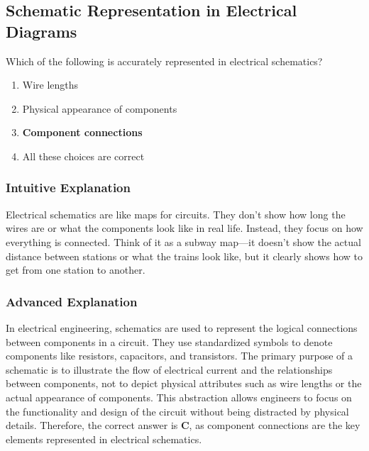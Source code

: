 \subsection{Schematic Representation in Electrical Diagrams}
\label{T6C12}

\begin{tcolorbox}[colback=gray!10!white,colframe=black!75!black,title=T6C12]
Which of the following is accurately represented in electrical schematics?
\begin{enumerate}[noitemsep]
    \item Wire lengths
    \item Physical appearance of components
    \item \textbf{Component connections}
    \item All these choices are correct
\end{enumerate}
\end{tcolorbox}

\subsubsection*{Intuitive Explanation}
Electrical schematics are like maps for circuits. They don't show how long the wires are or what the components look like in real life. Instead, they focus on how everything is connected. Think of it as a subway map—it doesn't show the actual distance between stations or what the trains look like, but it clearly shows how to get from one station to another.

\subsubsection*{Advanced Explanation}
In electrical engineering, schematics are used to represent the logical connections between components in a circuit. They use standardized symbols to denote components like resistors, capacitors, and transistors. The primary purpose of a schematic is to illustrate the flow of electrical current and the relationships between components, not to depict physical attributes such as wire lengths or the actual appearance of components. This abstraction allows engineers to focus on the functionality and design of the circuit without being distracted by physical details. Therefore, the correct answer is \textbf{C}, as component connections are the key elements represented in electrical schematics.